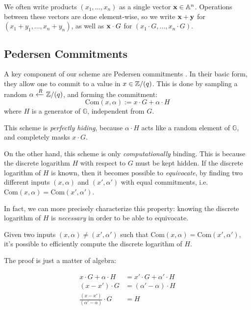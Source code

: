 We often write products $(x_1, \ldots, x_n)$ as a single vector
$\textbf{x} \in \mathbb{A}^n$. Operations between these vectors
are done element-wise, so we write $\textbf{x} + \textbf{y}$ for ${(x_1 + y_1, \ldots, x_n + y_n)}$,
as well as $\textbf{x} \cdot G$ for $(x_1 \cdot G, \ldots, x_n \cdot G)$.

\subsection{Pedersen Commitments}

A key component of our scheme are Pedersen commitments \cite{pedersen_non-interactive_1992}.
In their basic form, they allow one to commit to a value in $x \in \mathbb{Z}/(q)$. This
is done by sampling a random $\alpha \xleftarrow{R} \mathbb{Z}/(q)$, and forming the commitment:
$$
\text{Com}(x, \alpha) := x \cdot G + \alpha \cdot H
$$
where $H$ is a generator of $\mathbb{G}$, independent from $G$.

This scheme is \emph{perfectly hiding}, because $\alpha \cdot H$ acts like
a random element of $\mathbb{G}$, and completely masks $x \cdot G$.

On the other hand, this scheme is only \emph{computationally} binding. This
is because the discrete logarithm $H$ with respect to $G$ must be kept hidden.
If the discrete logarithm of $H$ is known, then it becomes possible to
\emph{equivocate}, by finding two different inputs $(x, \alpha)$ and $(x', \alpha')$ with
equal commitments, i.e. $\text{Com}(x, \alpha) = \text{Com}(x', \alpha')$.

In fact, we can more precisely characterize this property: knowing
the discrete logarithm of $H$ is \emph{necessary} in order to be able
to equivocate.

\begin{claim}
    \label{claim:ped_dlog}
    Given two inputs $(x, \alpha) \neq (x', \alpha')$ such that ${\text{Com}(x, \alpha) = \text{Com}(x', \alpha')}$,
    it's possible to efficiently compute the discrete logarithm of $H$.
\end{claim}

The proof is just a matter of algebra:

$$
\begin{aligned}
x \cdot G + \alpha \cdot H &= x' \cdot G + \alpha' \cdot H\\
(x - x') \cdot G &= (\alpha' - \alpha) \cdot H\\
\frac{(x - x')}{(\alpha' - \alpha)} \cdot G &= H\\
\end{aligned}
$$

